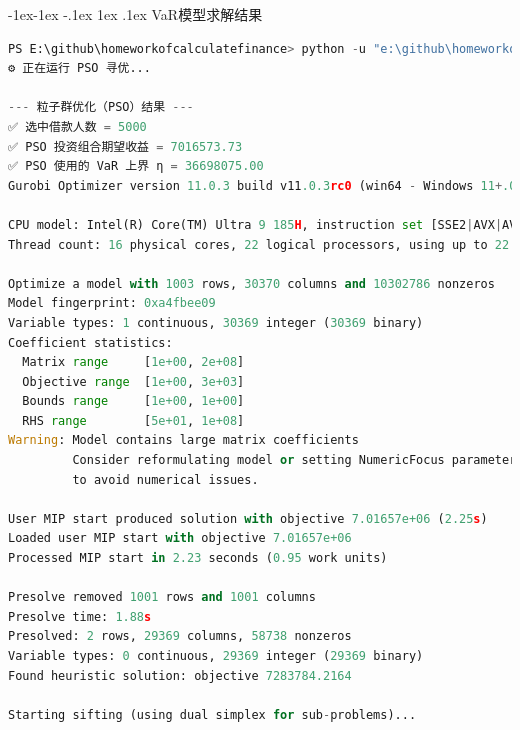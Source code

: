 \documentclass[12pt,nonblindrev]{write_paper}
\makeatletter
\renewcommand\subsection{\@startsection{subsection}{2}{\z@}%
                                     {-1ex\@plus -1ex \@minus -.1ex}%
                                     {1ex \@plus .1ex}%
                                     {\normalfont \normalsize \bfseries}}
\makeatother
\begin{document}
\subsection{VaR模型求解结果}
\begin{lstlisting}[language=python]
  PS E:\github\homeworkofcalculatefinance> python -u "e:\github\homeworkofcalculatefinance\5-25-模型求解\pso_gurobi_VaR.py"
⚙️ 正在运行 PSO 寻优...

--- 粒子群优化（PSO）结果 ---
✅ 选中借款人数 = 5000
✅ PSO 投资组合期望收益 = 7016573.73
✅ PSO 使用的 VaR 上界 η = 36698075.00
Gurobi Optimizer version 11.0.3 build v11.0.3rc0 (win64 - Windows 11+.0 (26100.2))

CPU model: Intel(R) Core(TM) Ultra 9 185H, instruction set [SSE2|AVX|AVX2]
Thread count: 16 physical cores, 22 logical processors, using up to 22 threads

Optimize a model with 1003 rows, 30370 columns and 10302786 nonzeros
Model fingerprint: 0xa4fbee09
Variable types: 1 continuous, 30369 integer (30369 binary)
Coefficient statistics:
  Matrix range     [1e+00, 2e+08]
  Objective range  [1e+00, 3e+03]
  Bounds range     [1e+00, 1e+00]
  RHS range        [5e+01, 1e+08]
Warning: Model contains large matrix coefficients
         Consider reformulating model or setting NumericFocus parameter
         to avoid numerical issues.

User MIP start produced solution with objective 7.01657e+06 (2.25s)
Loaded user MIP start with objective 7.01657e+06
Processed MIP start in 2.23 seconds (0.95 work units)

Presolve removed 1001 rows and 1001 columns
Presolve time: 1.88s
Presolved: 2 rows, 29369 columns, 58738 nonzeros
Variable types: 0 continuous, 29369 integer (29369 binary)
Found heuristic solution: objective 7283784.2164

Starting sifting (using dual simplex for sub-problems)...


\end{lstlisting}
\end{document}

